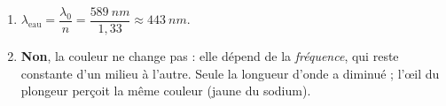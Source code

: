 \documentclass[11pt,a4paper]{article}
\begin{document}
\begin{corrige}
\begin{enumerate}[label=\alph*)]
  \item $\lambda_{\text{eau}}=\dfrac{\lambda_0}{n}=\dfrac{\qty{589}{nm}}{1{,}33}\approx\qty{443}{nm}$.
  \item \textbf{Non}, la couleur ne change pas : elle dépend de la \emph{fréquence}, qui reste
        constante d'un milieu à l'autre. Seule la longueur d'onde a diminué ; l'\oe il du plongeur
        perçoit la même couleur (jaune du sodium).
\end{enumerate}
\end{corrige}
\end{document}

